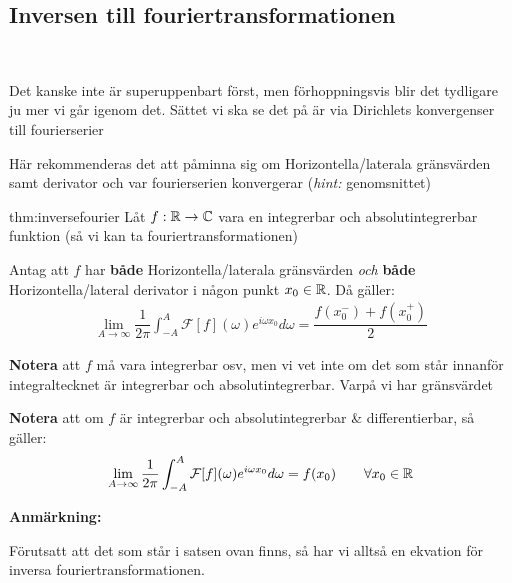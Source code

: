 \subsection{Inversen till fouriertransformationen}\hfill\\\par
\noindent Det kanske inte är superuppenbart först, men förhoppningsvis blir det tydligare ju mer vi går igenom det. Sättet vi ska se det på är via Dirichlets konvergenser till fourierserier
\par\bigskip
\noindent Här rekommenderas det att påminna sig om Horizontella/laterala gränsvärden samt derivator och var fourierserien konvergerar (\textit{hint:} genomsnittet)
\par\bigskip
\begin{theo}{thm:inversefourier}
  Låt $f:\mathbb{R}\to\mathbb{C}$ vara en integrerbar och absolutintegrerbar funktion (så vi kan ta fouriertransformationen) 
  \par\bigskip
  \noindent Antag att $f$ har \textbf{både} Horizontella/laterala gränsvärden \textit{och} \textbf{både} Horizontella/lateral derivator i någon punkt $x_0\in\mathbb{R}$. Då gäller:
  \begin{equation*}
    \begin{gathered}
      \lim_{A\to\infty}\dfrac{1}{2\pi}\int_{-A}^{A}\mathcal{F}[f](\omega)e^{i\omega x_0}d\omega = \dfrac{f(x_0^-)+f(x_0^+)}{2}
    \end{gathered}
  \end{equation*}
  \par\bigskip
  \noindent\textbf{Notera }att $f$ må vara integrerbar osv, men vi vet inte om det som står innanför integraltecknet är integrerbar och absolutintegrerbar. Varpå vi har gränsvärdet 
  \par\bigskip
  \noindent\textbf{Notera} att om $f$ är integrerbar och absolutintegrerbar \& differentierbar, så gäller:
  \begin{equation*}
    \begin{gathered}
      \lim_{A\to\infty}\dfrac{1}{2\pi}\int_{-A}^{A}\mathcal{F}[f](\omega)e^{i\omega x_0}d\omega = f(x_0)\qquad\forall x_0\in\mathbb{R}
    \end{gathered}
  \end{equation*}
\end{theo}
\par\bigskip
\noindent\textbf{Anmärkning:}\par
\noindent Förutsatt att det som står i satsen ovan finns, så har vi alltså en ekvation för inversa fouriertransformationen.
